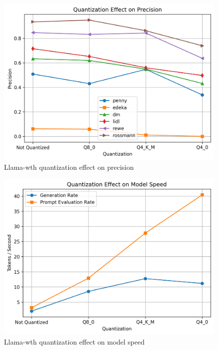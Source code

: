 \documentclass[licencjacka,en]{pracamgr}
\begin{document}
\begin{appendices}
\begin{figure}[ht]
    \centering
    \includegraphics[width=0.8\linewidth]{bachelor_images/quant_comp/quantization_effect_on_precision.png}
    \caption{Llama-wth quantization effect on precision}
    \label{fig:quantization_effect_on_precision}
\end{figure}

\begin{figure}[ht]
    \centering
    \includegraphics[width=0.8\linewidth]{bachelor_images/quant_comp/quantization_effect_on_model_speed.png}
    \caption{Llama-wth quantization effect on model speed}
    \label{fig:quantization_effect_on_model_speed}
\end{figure}


\end{appendices}
\end{document}
